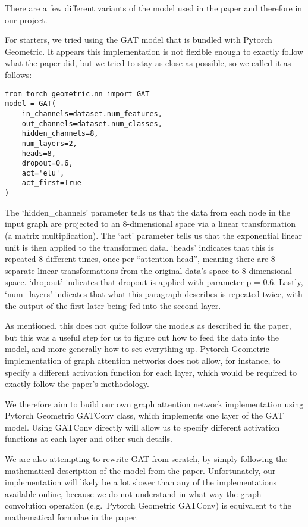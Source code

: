 There are a few different variants of the model used in the paper and
therefore in our project.

For starters, we tried using the GAT model that is bundled with Pytorch
Geometric.
It appears this implementation is not flexible enough to exactly
follow what the paper did, but we tried to stay as close as possible, so we
called it as follows:

\begin{verbatim}
from torch_geometric.nn import GAT
model = GAT(
    in_channels=dataset.num_features,
    out_channels=dataset.num_classes,
    hidden_channels=8,
    num_layers=2,
    heads=8,
    dropout=0.6,
    act='elu',
    act_first=True
)
\end{verbatim}



The `hidden\_channels' parameter tells us that the data from each node in the
input graph are projected to an 8-dimensional space via a linear
transformation (a matrix multiplication).
The `act' parameter tells us that
the exponential linear unit is then applied to the transformed data.
`heads' indicates that this is repeated 8 different times, once per ``attention head'',
meaning there are 8 separate linear transformations from the original data's
space to 8-dimensional space.
`dropout' indicates that dropout is applied with
parameter p = 0.6. Lastly, `num\_layers' indicates that what this paragraph
describes is repeated twice, with the output of the first later being fed into
the second layer.

As mentioned, this does not quite follow the models as described in the paper,
but this was a useful step for us to figure out how to feed the data into the
model, and more generally how to set everything up.
Pytorch Geometric implementation of graph attention networks does not allow, for instance, to
specify a different activation function for each layer, which would be
required to exactly follow the paper's methodology.

We therefore aim to build our own graph attention network implementation using
Pytorch Geometric GATConv class, which implements one layer of the GAT
model.
Using GATConv directly will allow us to specify different activation
functions at each layer and other such details.

We are also attempting to rewrite GAT from scratch, by simply following the
mathematical description of the model from the paper.
Unfortunately, our implementation will likely be a lot slower than any of the implementations
available online, because we do not understand in what way the graph
convolution operation (e.g.\ Pytorch Geometric GATConv) is equivalent to the
mathematical formulae in the paper.
